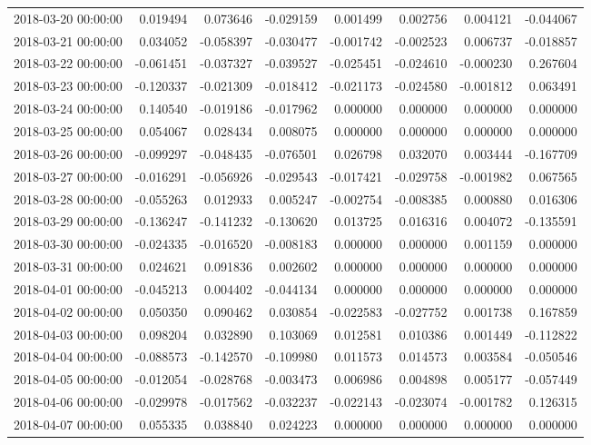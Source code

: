 \begin{tabular}{lrrrrrrr}
2018-03-20 00:00:00 & 0.019494 & 0.073646 & -0.029159 & 0.001499 & 0.002756 & 0.004121 & -0.044067 \\
2018-03-21 00:00:00 & 0.034052 & -0.058397 & -0.030477 & -0.001742 & -0.002523 & 0.006737 & -0.018857 \\
2018-03-22 00:00:00 & -0.061451 & -0.037327 & -0.039527 & -0.025451 & -0.024610 & -0.000230 & 0.267604 \\
2018-03-23 00:00:00 & -0.120337 & -0.021309 & -0.018412 & -0.021173 & -0.024580 & -0.001812 & 0.063491 \\
2018-03-24 00:00:00 & 0.140540 & -0.019186 & -0.017962 & 0.000000 & 0.000000 & 0.000000 & 0.000000 \\
2018-03-25 00:00:00 & 0.054067 & 0.028434 & 0.008075 & 0.000000 & 0.000000 & 0.000000 & 0.000000 \\
2018-03-26 00:00:00 & -0.099297 & -0.048435 & -0.076501 & 0.026798 & 0.032070 & 0.003444 & -0.167709 \\
2018-03-27 00:00:00 & -0.016291 & -0.056926 & -0.029543 & -0.017421 & -0.029758 & -0.001982 & 0.067565 \\
2018-03-28 00:00:00 & -0.055263 & 0.012933 & 0.005247 & -0.002754 & -0.008385 & 0.000880 & 0.016306 \\
2018-03-29 00:00:00 & -0.136247 & -0.141232 & -0.130620 & 0.013725 & 0.016316 & 0.004072 & -0.135591 \\
2018-03-30 00:00:00 & -0.024335 & -0.016520 & -0.008183 & 0.000000 & 0.000000 & 0.001159 & 0.000000 \\
2018-03-31 00:00:00 & 0.024621 & 0.091836 & 0.002602 & 0.000000 & 0.000000 & 0.000000 & 0.000000 \\
2018-04-01 00:00:00 & -0.045213 & 0.004402 & -0.044134 & 0.000000 & 0.000000 & 0.000000 & 0.000000 \\
2018-04-02 00:00:00 & 0.050350 & 0.090462 & 0.030854 & -0.022583 & -0.027752 & 0.001738 & 0.167859 \\
2018-04-03 00:00:00 & 0.098204 & 0.032890 & 0.103069 & 0.012581 & 0.010386 & 0.001449 & -0.112822 \\
2018-04-04 00:00:00 & -0.088573 & -0.142570 & -0.109980 & 0.011573 & 0.014573 & 0.003584 & -0.050546 \\
2018-04-05 00:00:00 & -0.012054 & -0.028768 & -0.003473 & 0.006986 & 0.004898 & 0.005177 & -0.057449 \\
2018-04-06 00:00:00 & -0.029978 & -0.017562 & -0.032237 & -0.022143 & -0.023074 & -0.001782 & 0.126315 \\
2018-04-07 00:00:00 & 0.055335 & 0.038840 & 0.024223 & 0.000000 & 0.000000 & 0.000000 & 0.000000 \\

\end{tabular}
